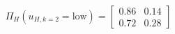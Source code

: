 \documentclass[border=3mm,preview]{standalone}\usepackage{amsmath}
\begin{document}
\[
\Pi_{H} \left( u_{H,k=2} = \text{low} \right)= 
\left[\begin{array}{cc} 
0.86 & 0.14 \\ 
0.72 & 0.28 
\end{array}\right] \] 
\end{document}
